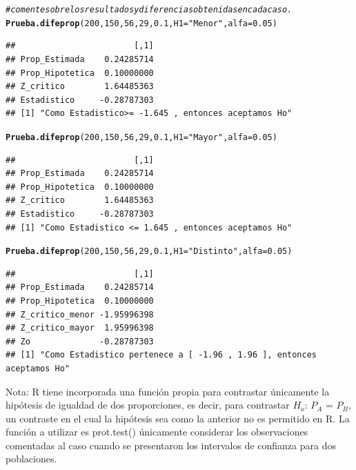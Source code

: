 \documentclass[12pt,letterpaper]{article}\usepackage[]{graphicx}\usepackage[]{color}
\makeatletter
\newcommand{\hlnum}[1]{\textcolor[rgb]{0.686,0.059,0.569}{#1}}%
\newcommand{\hlstr}[1]{\textcolor[rgb]{0.192,0.494,0.8}{#1}}%
\newcommand{\hlcom}[1]{\textcolor[rgb]{0.678,0.584,0.686}{\textit{#1}}}%
\newcommand{\hlstd}[1]{\textcolor[rgb]{0.345,0.345,0.345}{#1}}%
\newcommand{\hlkwc}[1]{\textcolor[rgb]{0.333,0.667,0.333}{#1}}%
\newcommand{\hlkwd}[1]{\textcolor[rgb]{0.737,0.353,0.396}{\textbf{#1}}}%
\newenvironment{kframe}{%
 \def\at@end@of@kframe{}%
 \ifinner\ifhmode%
  \def\at@end@of@kframe{\end{minipage}}%
  \begin{minipage}{\columnwidth}%
 \fi\fi%
 \def\FrameCommand##1{\hskip\@totalleftmargin \hskip-\fboxsep
 \colorbox{shadecolor}{##1}\hskip-\fboxsep
     \hskip-\linewidth \hskip-\@totalleftmargin \hskip\columnwidth}%
 \MakeFramed {\advance\hsize-\width
   \@totalleftmargin\z@ \linewidth\hsize
   \@setminipage}}%
 {\par\unskip\endMakeFramed%
 \at@end@of@kframe}
\newenvironment{knitrout}{}{} %
\makeatother
\begin{document}
\begin{knitrout}
\begin{kframe}
\begin{alltt}
\hlcom{# comente sobre los resultados y diferencias obtenidas en cada caso. }
\hlkwd{Prueba.difeprop} \hlstd{(}\hlnum{200}\hlstd{,} \hlnum{150}\hlstd{,} \hlnum{56}\hlstd{,} \hlnum{29}\hlstd{,} \hlnum{0.1}\hlstd{,} \hlkwc{H1}\hlstd{=}\hlstr{"Menor"}\hlstd{,} \hlkwc{alfa}\hlstd{=}\hlnum{0.05}\hlstd{)}
\end{alltt}
\begin{verbatim}
##                        [,1]
## Prop_Estimada    0.24285714
## Prop_Hipotetica  0.10000000
## Z_critico        1.64485363
## Estadistico     -0.28787303
## [1] "Como Estadistico>= -1.645 , entonces aceptamos Ho"
\end{verbatim}
\begin{alltt}
\hlkwd{Prueba.difeprop} \hlstd{(}\hlnum{200}\hlstd{,} \hlnum{150}\hlstd{,} \hlnum{56}\hlstd{,} \hlnum{29}\hlstd{,} \hlnum{0.1}\hlstd{,} \hlkwc{H1}\hlstd{=}\hlstr{"Mayor"}\hlstd{,} \hlkwc{alfa}\hlstd{=}\hlnum{0.05}\hlstd{)}
\end{alltt}
\begin{verbatim}
##                        [,1]
## Prop_Estimada    0.24285714
## Prop_Hipotetica  0.10000000
## Z_critico        1.64485363
## Estadistico     -0.28787303
## [1] "Como Estadistico <= 1.645 , entonces aceptamos Ho"
\end{verbatim}
\begin{alltt}
\hlkwd{Prueba.difeprop} \hlstd{(}\hlnum{200}\hlstd{,} \hlnum{150}\hlstd{,} \hlnum{56}\hlstd{,} \hlnum{29}\hlstd{,} \hlnum{0.1}\hlstd{,} \hlkwc{H1}\hlstd{=}\hlstr{"Distinto"}\hlstd{,} \hlkwc{alfa}\hlstd{=}\hlnum{0.05}\hlstd{)}
\end{alltt}
\begin{verbatim}
##                        [,1]
## Prop_Estimada    0.24285714
## Prop_Hipotetica  0.10000000
## Z_critico_menor -1.95996398
## Z_critico_mayor  1.95996398
## Zo              -0.28787303
## [1] "Como Estadistico pertenece a [ -1.96 , 1.96 ], entonces aceptamos Ho"
\end{verbatim}
\end{kframe}
\end{knitrout}

Nota: R tiene incorporada una funci\'on propia para contrastar \'unicamente la hip\'otesis de igualdad de dos proporciones, es decir, para contrastar $H_o$: $P_A$ = $P_B$, un contraste en el cual la hip\'otesis sea como la anterior no es permitido en R. La funci\'on a  utilizar es prot.test() \'unicamente considerar los observaciones comentadas al caso cuando se presentaron los intervalos de confianza para dos poblaciones.\\
\end{document}

